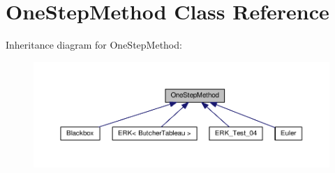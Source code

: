 \hypertarget{classOneStepMethod}{}\section{One\+Step\+Method Class Reference}
\label{classOneStepMethod}


Inheritance diagram for One\+Step\+Method\+:\nopagebreak
\begin{figure}[H]
\begin{center}
\leavevmode
\includegraphics[width=350pt]{classOneStepMethod__inherit__graph}
\end{center}
\end{figure}
